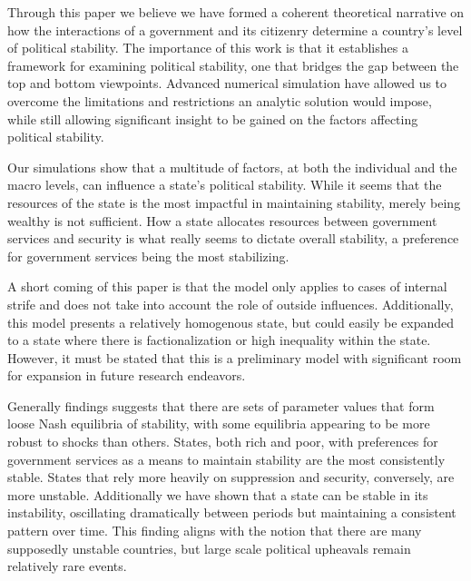 \documentclass[12pt]{article}
\begin{document}
\begin{spacing}{1.5}
Through this paper we believe we have formed a coherent theoretical narrative on how the interactions of a government and its citizenry determine a country's level of political stability. The importance of this work is that it establishes a framework for examining political stability, one that bridges the gap between the top and bottom viewpoints. Advanced numerical simulation have allowed us to overcome the limitations and restrictions an analytic solution would impose, while still allowing significant insight to be gained on the factors affecting political stability. 
 
Our simulations show that a multitude of factors, at both the individual and the macro levels, can influence a state’s political stability. While it seems that the resources of the state is the most impactful in maintaining stability, merely being wealthy is not sufficient. How a state allocates resources between government services and security is what really seems to dictate overall stability, a preference for government services being the most stabilizing. 
 
A short coming of this paper is that the model only applies to cases of internal strife and does not take into account the role of outside influences. Additionally, this model presents a relatively homogenous state, but could easily be expanded to a state where there is factionalization or high inequality within the state. However, it must be stated that this is a preliminary model with significant room for expansion in future research endeavors. 
 
Generally findings suggests that there are sets of parameter values that form loose Nash equilibria of stability, with some equilibria appearing to be more robust to shocks than others. States, both rich and poor, with preferences for government services as a means to maintain stability are the most consistently stable. States that rely more heavily on suppression and security, conversely, are more unstable. Additionally we have shown that a state can be stable in its instability, oscillating dramatically between periods but maintaining a consistent pattern over time. This finding aligns with the notion that there are many supposedly unstable countries, but large scale political upheavals remain relatively rare events. 
 

 

\end{spacing}


\pagebreak




\nocite{*}
\end{document}
